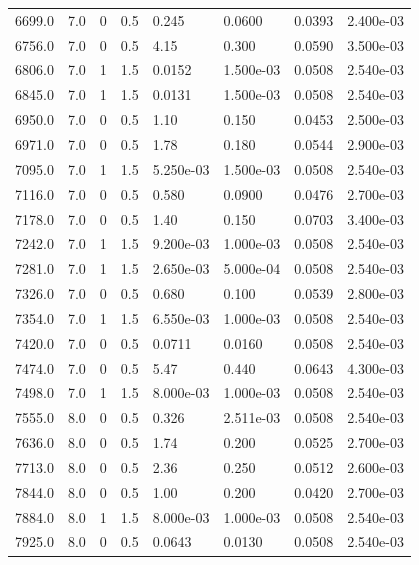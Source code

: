 \documentclass[preview]{standalone}
\begin{document}
{{{{\begin{tabular}{L{1.2cm}C{1.2cm} C{0.3cm}C{0.5cm} C{1.4cm}C{1.4cm} C{1.4cm}C{1.4cm}}
  6699.0  &   7.0  & 0     & 0.5 &  0.245  & 0.0600  & 0.0393 &  2.400e-03   \\ 
  6756.0  &   7.0  & 0     & 0.5 &  4.15  & 0.300  & 0.0590 &  3.500e-03   \\ 
  6806.0  &   7.0  & 1     & 1.5 &  0.0152  & 1.500e-03  & 0.0508 &  2.540e-03   \\ 
  6845.0  &   7.0  & 1     & 1.5 &  0.0131  & 1.500e-03  & 0.0508 &  2.540e-03   \\ 
  6950.0  &   7.0  & 0     & 0.5 &  1.10  & 0.150  & 0.0453 &  2.500e-03   \\ 
  6971.0  &   7.0  & 0     & 0.5 &  1.78  & 0.180  & 0.0544 &  2.900e-03   \\ 
  7095.0  &   7.0  & 1     & 1.5 &  5.250e-03  & 1.500e-03  & 0.0508 &  2.540e-03   \\ 
  7116.0  &   7.0  & 0     & 0.5 &  0.580  & 0.0900  & 0.0476 &  2.700e-03   \\ 
  7178.0  &   7.0  & 0     & 0.5 &  1.40  & 0.150  & 0.0703 &  3.400e-03   \\ 
  7242.0  &   7.0  & 1     & 1.5 &  9.200e-03  & 1.000e-03  & 0.0508 &  2.540e-03   \\ 
  7281.0  &   7.0  & 1     & 1.5 &  2.650e-03  & 5.000e-04  & 0.0508 &  2.540e-03   \\ 
  7326.0  &   7.0  & 0     & 0.5 &  0.680  & 0.100  & 0.0539 &  2.800e-03   \\ 
  7354.0  &   7.0  & 1     & 1.5 &  6.550e-03  & 1.000e-03  & 0.0508 &  2.540e-03   \\ 
  7420.0  &   7.0  & 0     & 0.5 &  0.0711  & 0.0160  & 0.0508 &  2.540e-03   \\ 
  7474.0  &   7.0  & 0     & 0.5 &  5.47  & 0.440  & 0.0643 &  4.300e-03   \\ 
  7498.0  &   7.0  & 1     & 1.5 &  8.000e-03  & 1.000e-03  & 0.0508 &  2.540e-03   \\ 
  7555.0  &   8.0  & 0     & 0.5 &  0.326  & 2.511e-03  & 0.0508 &  2.540e-03   \\ 
  7636.0  &   8.0  & 0     & 0.5 &  1.74  & 0.200  & 0.0525 &  2.700e-03   \\ 
  7713.0  &   8.0  & 0     & 0.5 &  2.36  & 0.250  & 0.0512 &  2.600e-03   \\ 
  7844.0  &   8.0  & 0     & 0.5 &  1.00  & 0.200  & 0.0420 &  2.700e-03   \\ 
  7884.0  &   8.0  & 1     & 1.5 &  8.000e-03  & 1.000e-03  & 0.0508 &  2.540e-03   \\ 
  7925.0  &   8.0  & 0     & 0.5 &  0.0643  & 0.0130  & 0.0508 &  2.540e-03   \\ 

\end{tabular}}}}}
\end{document}
